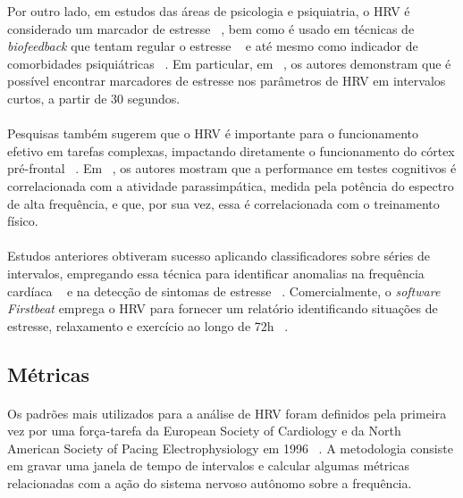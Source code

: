             Por outro lado, em estudos das áreas de psicologia e psiquiatria, o HRV é considerado um marcador de estresse ~\cite{ Bernardi2000EffectsVariability, Castaldo2015AcuteMeta-analysis, Prinsloo2011TheStress, Vanitha2014HierarchicalVariability,}, bem como é usado em técnicas de \textit{biofeedback} que tentam regular o estresse ~\cite{Sasaki2014ConsciouslyActivity} e até mesmo como indicador de comorbidades psiquiátricas ~\cite{Quintana2016GuidelinesCommunication}. Em particular, em ~\cite{Salahuddin2007UltraSettings}, os autores demonstram que é possível encontrar marcadores de estresse nos parâmetros de HRV em intervalos curtos, a partir de 30 segundos.
            
            \paragraph{} Pesquisas também sugerem que o HRV é importante para o funcionamento efetivo em tarefas complexas, impactando diretamente o funcionamento do córtex pré-frontal ~\cite{Hansen2004HeartDetraining, Prinsloo2011TheStress, Luque-Casado2013CognitiveLevel}. Em  ~\cite{Hansen2004HeartDetraining}, os autores mostram que a performance em testes cognitivos é correlacionada com a atividade parassimpática, medida pela potência do espectro de alta frequência, e que, por sua vez, essa é correlacionada com o treinamento físico.
            
            \paragraph{} Estudos anteriores obtiveram sucesso aplicando classificadores sobre séries de intervalos, empregando essa técnica para identificar anomalias na frequência cardíaca ~\cite{Kampouraki2009HeartbeatMachines} e na detecção de sintomas de estresse ~\cite{Sami2004ArtefactData, Vanitha2014HierarchicalVariability}. Comercialmente, o \textit{software Firstbeat} emprega o HRV para fornecer um relatório identificando situações de estresse, relaxamento e exercício ao longo de 72h ~\cite{FirstbeatTechnologiesLtd.2014StressVariability}. 
            
        \subsection {Métricas}
        
            \paragraph{} Os padrões mais utilizados para a análise de HRV foram definidos pela primeira vez por uma força-tarefa da European Society of Cardiology e da North American Society of Pacing Electrophysiology em 1996 ~\cite{TaskForceoftheEuropeanSocietyofCardiologytheNorthAmericanSocietyofPacing1996HeartUse}. A metodologia consiste em gravar uma janela de tempo de intervalos e calcular algumas métricas relacionadas com a ação do sistema nervoso autônomo sobre a frequência. 
            

